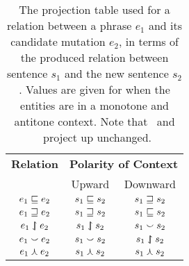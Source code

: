 \begin{table}[t]
	\begin{center}
	\begin{tabular}{c|cc}
    \textbf{Relation} & \multicolumn{2}{c}{\textbf{Polarity of Context}} \\
             & Upward & Downward \\
    \hline
    $e_1 \sqsubseteq     e_2$ & $s_1 \sqsubseteq     s_2$ & $s_1 \sqsupseteq     s_2$ \\ 
    $e_1 \sqsupseteq     e_2$ & $s_1 \sqsupseteq     s_2$ & $s_1 \sqsubseteq     s_2$ \\ 
    $e_1 \downharpoonleft\hspace{-1.25mm}\upharpoonright   e_2$ & $s_1 \downharpoonleft\hspace{-1.25mm}\upharpoonright   s_2$ & $s_1 \smallsmile       s_2$ \\ 
    $e_1 \smallsmile       e_2$ & $s_1 \smallsmile       s_2$ & $s_1 \downharpoonleft\hspace{-1.25mm}\upharpoonright   s_2$ \\ 
    $e_1 \curlywedge      e_2$ & $s_1 \curlywedge      s_2$ & $s_1 \curlywedge      s_2$ \\ 
	\end{tabular}
	\caption{
    The projection table used for a relation between a phrase $e_1$ and
      its candidate mutation $e_2$, in terms of the produced relation
      between sentence $s_1$ and the new sentence $s_2$.
    Values are given for when the entities are in a monotone and
      antitone context.
    Note that \equivalent\ and \independent\ project up unchanged.
		\label{tab:projectivity}
	}
	\end{center}
\end{table}



